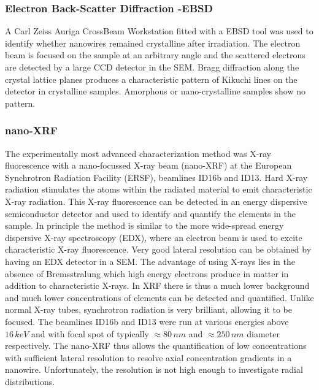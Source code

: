 \subsubsection{Electron Back-Scatter Diffraction -EBSD}

A Carl Zeiss Auriga CrossBeam Workstation fitted with a EBSD tool was used to identify whether nanowires remained crystalline after irradiation. The electron beam is focused on the sample at an arbitrary angle and the scattered electrons are detected by a large CCD detector in the SEM. Bragg diffraction along the crystal lattice planes produces a characteristic pattern of Kikuchi lines on the detector \cite{kikuchi_diffraction_1928,fultz_transmission_2013} in crystalline samples. Amorphous or nano-crystalline samples show no pattern.

\subsubsection{nano-XRF}

The experimentally most advanced characterization method was X-ray fluorescence with a nano-focussed X-ray beam (nano-XRF) at the European Synchrotron Radiation Facility (ERSF), beamlines ID16b and ID13. Hard X-ray radiation stimulates the atoms within the radiated material to emit characteristic X-ray radiation. This X-ray fluorescence can be detected in an energy dispersive semiconductor detector and used to identify and quantify the elements in the sample. In principle the method is similar to the more wide-spread energy dispersive X-ray spectroscopy (EDX), where an electron beam is used to excite characteristic X-ray fluorescence. Very good lateral resolution can be obtained by having an EDX detector in a SEM. The advantage of using X-rays lies in the absence of Bremsstralung which high energy electrons produce in matter in addition to characteristic X-rays. In XRF there is thus a much lower background and much lower concentrations of elements can be detected and quantified. Unlike normal X-ray tubes, synchrotron radiation is very brilliant, allowing it to be focused. The beamlines ID16b and ID13 were run at various energies above $16\,keV$ and with focal spot of typically $\approx 80\,nm$ and $\approx 250\,nm$ diameter respectively. The nano-XRF thus allows the quantification of low concentrations with sufficient lateral resolution to resolve axial concentration gradients in a nanowire. Unfortunately, the resolution is not high enough to investigate radial distributions.

